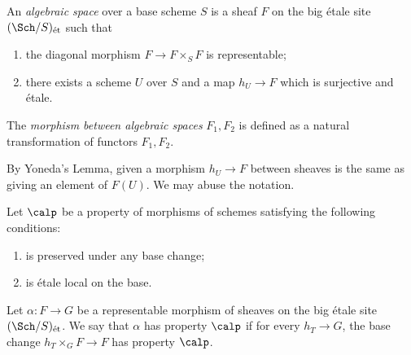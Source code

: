 
    \begin{definition}\label{def:algebraic_space_as_sheaf}
        An \emph{algebraic space} over a base scheme \(S\) is a sheaf \(F\) on the big \'etale site \((\Sch/S)_{\text{\'et}}\) such that 
        \begin{enumerate}
            \item the diagonal morphism \(F \to F \times_S F\) is representable;
            \item there exists a scheme \(U\) over \(S\) and a map \(h_U \to F\) which is surjective and \'etale.
        \end{enumerate}
        The \emph{morphism between algebraic spaces} \(F_1,F_2\) is defined as a natural transformation of functors \(F_1, F_2\).
    \end{definition}

    \begin{remark}
        By Yoneda's Lemma, given a morphism \(h_U \to F\) between sheaves is the same as giving an element of \(F(U)\).
        We may abuse the notation.
    \end{remark}

    \begin{definition}\label{def:properties_of_sheaves_by_scheme}
        Let \(\calp\) be a property of morphisms of schemes satisfying the following conditions:
        \begin{enumerate}
            \item is preserved under any base change;
            \item is \'etale local on the base.
        \end{enumerate}
        Let \(\alpha: F \to G\) be a representable morphism of sheaves on the big \'etale site \((\Sch/S)_{\text{\'et}}\).
        We say that \(\alpha\) has property \(\calp\) if for every \(h_T \to G\), the base change \(h_T\times_{G} F \to F\) has property \(\calp\).
    \end{definition}

